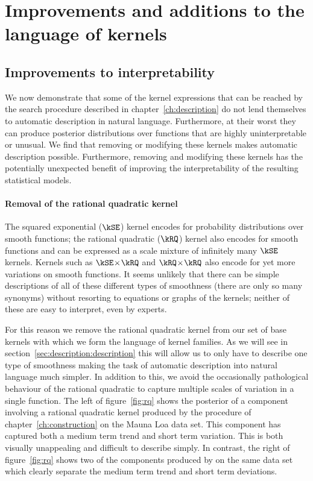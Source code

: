 \section{Improvements and additions to the language of kernels}
\label{sec:description:design}

\subsection{Improvements to interpretability}

We now demonstrate that some of the kernel expressions that can be reached by the search procedure described in chapter~\ref{ch:description} do not lend themselves to automatic description in natural language.
Furthermore, at their worst they can produce posterior distributions over functions that are highly uninterpretable or unusual.
We find that removing or modifying these kernels makes automatic description possible.
Furthermore, removing and modifying these kernels has the potentially unexpected benefit of improving the interpretability of the resulting statistical models.

\paragraph{Removal of the rational quadratic kernel}

The squared exponential ($\kSE$)  kernel encodes for probability distributions over smooth functions; the rational quadratic ($\kRQ$) kernel also encodes for smooth functions and can be expressed as a scale mixture of infinitely many $\kSE$ kernels.
Kernels such as $\kSE \kerntimes \kRQ$ and $\kRQ \kerntimes \kRQ$ also encode for yet more variations on smooth functions.
It seems unlikely that there can be simple descriptions of all of these different types of smoothness (there are only so many synonyms) without resorting to equations or graphs of the kernels; neither of these are easy to interpret, even by experts.

For this reason we remove the rational quadratic kernel from our set of base kernels with which we form the language of kernel families.
As we will see in section~\ref{sec:description:description} this will allow us to only have to describe one type of smoothness making the task of automatic description into natural language much simpler.
In addition to this, we avoid the occasionally pathological behaviour of the rational quadratic to capture multiple scales of variation in a single function.
The left of figure~\ref{fig:rq} shows the posterior of a component involving a rational quadratic kernel produced by the procedure of chapter~\ref{ch:construction} on the Mauna Loa data set.
This component has captured both a medium term trend and short term variation.
This is both visually unappealing and difficult to describe simply.
In contrast, the right of figure~\ref{fig:rq} shows two of the components produced by \procedurename{} on the same data set which clearly separate the medium term trend and short term deviations.

